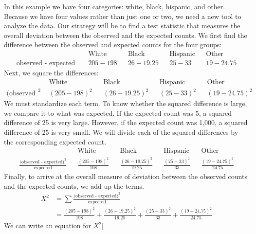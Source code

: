 In this example we have four categories: white, black, hispanic, and other. Because we have four values rather than just one or two, we need a new tool to analyze the data. Our strategy will be to find a test statistic that measures the overall deviation between the observed and the expected counts. We first find the difference between the observed and expected counts for the four groups:
\begin{align*}
&&\text{White} && \text{Black} && \text{Hispanic} && \text{Other} \\
\text{observed - expected }&& 205-198 && 26-19.25
	&& 25-33
	&& 19-24.75
\end{align*}
Next, we square the differences:
\begin{align*}
&&\text{White} && \text{Black} && \text{Hispanic} && \text{Other} \\
\text{(observed - expected)}^2 && (205-198)^2 && (26-19.25)^2
	&& (25-33)^2
	&& (19-24.75)^2
\end{align*}
We must standardize each term. To know whether the squared difference is large, we compare it to what was expected. If the expected count was 5, a squared difference of 25 is very large. However, if the expected count was 1,000, a squared difference of 25 is very small. We will divide each of the squared differences by the corresponding expected count.
\begin{align*}
&&\text{White} && \text{Black} && \text{Hispanic} && \text{Other} \\
\frac{\text{(observed - expected)}^2}{\text{expected}} && \frac{(205-198)^2}{198} && \frac{(26-19.25)^2 }{19.25}
	&& \frac{(25-33)^2}{33}
	&& \frac{(19-24.75)^2}{24.75}
\end{align*}
Finally, to arrive at the overall measure of deviation between the observed counts and the expected counts, we add up the terms.
\begin{align*}
X^2 &= \sum{\frac{\text{(observed - expected)}^2}{\text{expected}}} \\
	&= \frac{(205-198)^2}{198}
		+ \frac{(26-19.25)^2 }{19.25}
		+ \frac{(25-33)^2}{33}
		+ \frac{(19-24.75)^2}{24.75}
\end{align*}
We can write an equation for $X^2$\marginpar[\raggedright\vspace{9mm}

